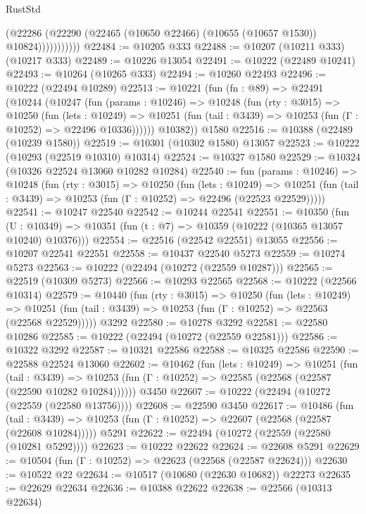 \begin{lexlean}{RustStd}
\begin{coremodule}
                    (@22286
                      (@22290 (@22465 (@10650 @22466) (@10655 (@10657 @1530)) @10824)))))))))))
@22484 := @10205 @333
@22488 := @10207 (@10211 @333) (@10217 @333)
@22489 := @10226 @13054
@22491 := @10222 (@22489 @10241)
@22493 := @10264 (@10265 @333)
@22494 := @10260 @22493
@22496 := @10222 (@22494 @10289)
@22513 := @10221
    (fun (fn : @89) =>
    @22491
      (@10244
        (@10247
          (fun (params : @10246) =>
          @10248
            (fun (rty : @3015) =>
            @10250
              (fun (lets : @10249) =>
              @10251 (fun (tail : @3439) => @10253 (fun (Γ : @10252) => @22496 @10336))))))
        @10382))
    @1580
@22516 := @10388 (@22489 (@10239 @1580))
@22519 := @10301 (@10302 @1580) @13057
@22523 := @10222 (@10293 (@22519 @10310) @10314)
@22524 := @10327 @1580
@22529 := @10324 (@10326 @22524 @13060 @10282 @10284)
@22540 := fun (params : @10246) =>
  @10248
    (fun (rty : @3015) =>
    @10250
      (fun (lets : @10249) =>
      @10251 (fun (tail : @3439) => @10253 (fun (Γ : @10252) => @22496 (@22523 @22529)))))
@22541 := @10247 @22540
@22542 := @10244 @22541
@22551 := @10350
    (fun (U : @10349) => @10351 (fun (t : @7) => @10359 (@10222 (@10365 @13057 @10240) @10376)))
@22554 := @22516 (@22542 @22551) @13055
@22556 := @10207 @22541 @22551
@22558 := @10437 @22540 @5273
@22559 := @10274 @5273
@22563 := @10222 (@22494 (@10272 (@22559 @10287)))
@22565 := @22519 (@10309 @5273)
@22566 := @10293 @22565
@22568 := @10222 (@22566 @10314)
@22579 := @10440
    (fun (rty : @3015) =>
    @10250
      (fun (lets : @10249) =>
      @10251 (fun (tail : @3439) => @10253 (fun (Γ : @10252) => @22563 (@22568 @22529)))))
    @3292
@22580 := @10278 @3292
@22581 := @22580 @10286
@22585 := @10222 (@22494 (@10272 (@22559 @22581)))
@22586 := @10322 @3292
@22587 := @10321 @22586
@22588 := @10325 @22586
@22590 := @22588 @22524 @13060
@22602 := @10462
    (fun (lets : @10249) =>
    @10251
      (fun (tail : @3439) =>
      @10253 (fun (Γ : @10252) => @22585 (@22568 (@22587 (@22590 @10282 @10284))))))
    @3450
@22607 := @10222 (@22494 (@10272 (@22559 (@22580 @13756))))
@22608 := @22590 @3450
@22617 := @10486
    (fun (tail : @3439) => @10253 (fun (Γ : @10252) => @22607 (@22568 (@22587 (@22608 @10284)))))
    @5291
@22622 := @22494 (@10272 (@22559 (@22580 (@10281 @5292))))
@22623 := @10222 @22622
@22624 := @22608 @5291
@22629 := @10504 (fun (Γ : @10252) => @22623 (@22568 (@22587 @22624)))
@22630 := @10522 @22
@22634 := @10517 (@10680 (@22630 @10682)) @22273
@22635 := @22629 @22634
@22636 := @10388 @22622
@22638 := @22566 (@10313 @22634)

\end{coremodule}
\end{lexlean}
